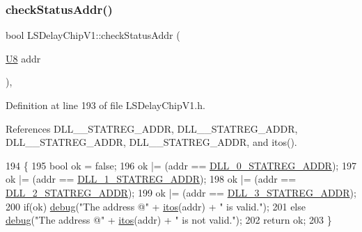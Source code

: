 \subsubsection{\texorpdfstring{check\+Status\+Addr()}{checkStatusAddr()}}
{\footnotesize\ttfamily bool L\+S\+Delay\+Chip\+V1\+::check\+Status\+Addr (\begin{DoxyParamCaption}\item[{\hyperlink{ICECALv3_8h_a3cb25ca6f51f003950f9625ff05536fc}{U8}}]{addr }\end{DoxyParamCaption})\hspace{0.3cm}{\ttfamily [inline]}, {\ttfamily [private]}}



Definition at line 193 of file L\+S\+Delay\+Chip\+V1.\+h.



References D\+L\+L\+\_\+\_\+\+S\+T\+A\+T\+R\+E\+G\+\_\+\+A\+D\+DR, D\+L\+L\+\_\+\_\+\+S\+T\+A\+T\+R\+E\+G\+\_\+\+A\+D\+DR, D\+L\+L\+\_\+\_\+\+S\+T\+A\+T\+R\+E\+G\+\_\+\+A\+D\+DR, D\+L\+L\+\_\+\_\+\+S\+T\+A\+T\+R\+E\+G\+\_\+\+A\+D\+DR, and itos().


\begin{DoxyCode}
194     \{
195          \textcolor{keywordtype}{bool} ok = \textcolor{keyword}{false};  
196          ok |= (addr == \hyperlink{LSDelayChipV1_8h_adca5cc0cd52b4fe9328f3471b0b9c613}{DLL\_0\_STATREG\_ADDR}); 
197          ok |= (addr == \hyperlink{LSDelayChipV1_8h_a39e2f4a0151fcdf29a28e917154fa039}{DLL\_1\_STATREG\_ADDR});
198          ok |= (addr == \hyperlink{LSDelayChipV1_8h_a11ad4f0e8a466fc2da33308f351b9054}{DLL\_2\_STATREG\_ADDR});
199          ok |= (addr == \hyperlink{LSDelayChipV1_8h_ad23a65fd56cf8a5ba711228025ab5e48}{DLL\_3\_STATREG\_ADDR});  
200          \textcolor{keywordflow}{if}(ok) \hyperlink{classObject_aac010553f022165573714b7014a15f0d}{debug}(\textcolor{stringliteral}{"The address @"} + \hyperlink{Tools_8h_af330027dbdafb9a30768b3613c553e60}{itos}(addr) + \textcolor{stringliteral}{" is valid."});
201          \textcolor{keywordflow}{else}   \hyperlink{classObject_aac010553f022165573714b7014a15f0d}{debug}(\textcolor{stringliteral}{"The address @"} + \hyperlink{Tools_8h_af330027dbdafb9a30768b3613c553e60}{itos}(addr) + \textcolor{stringliteral}{" is not valid."});         
202          \textcolor{keywordflow}{return} ok;           
203     \}
\end{DoxyCode}
\mbox{\label{classHierarchy_a1e207f973c694b538bf90107b4868817}} 

